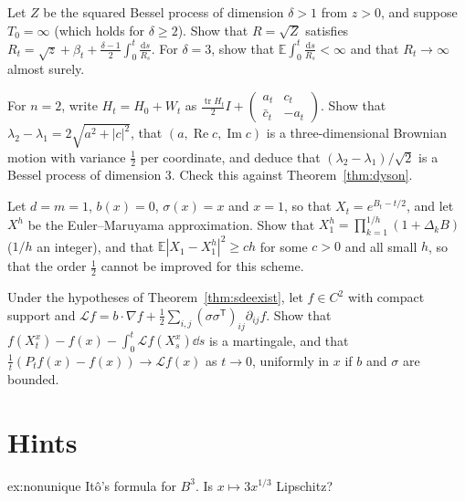 \begin{exercise}[$\star\star$]\label{ex:bessel3}
Let $Z$ be the squared Bessel process of dimension $\delta>1$ from $z>0$, and suppose $T_0=\infty$ (which holds for $\delta\ge2$). Show that $R=\sqrt Z$ satisfies $R_t=\sqrt z+\beta_t+\frac{\delta-1}2\int_0^t\frac{\mathrm ds}{R_s}$.
For $\delta=3$, show that $\mathbb E\int_0^t\frac{\mathrm ds}{R_s}<\infty$ and that $R_t\to\infty$ almost surely.
\end{exercise}

\begin{exercise}[$\star\star$]\label{ex:twobytwo}
For $n=2$, write $H_t=H_0+W_t$ as $\frac{\operatorname{tr}H_t}2I+\begin{pmatrix}a_t&c_t\\\bar c_t&-a_t\end{pmatrix}$. Show that $\lambda_2-\lambda_1=2\sqrt{a^2+|c|^2}$, that $(a,\operatorname{Re}c,\operatorname{Im}c)$ is a
three-dimensional Brownian motion with variance $\frac12$ per coordinate, and deduce that $(\lambda_2-\lambda_1)/\sqrt2$ is a Bessel process of dimension $3$. Check this against Theorem~\ref{thm:dyson}.
\end{exercise}

\begin{exercise}[$\star\star$]\label{ex:emgbm}
Let $d=m=1$, $b(x)=0$, $\sigma(x)=x$ and $x=1$, so that $X_t=e^{B_t-t/2}$, and let $X^h$ be the Euler--Maruyama approximation. Show that $X^h_1=\prod_{k=1}^{1/h}(1+\Delta_kB)$ ($1/h$ an integer), and that
$\mathbb E|X_1-X^h_1|^2\ge ch$ for some $c>0$ and all small $h$, so that the order $\frac12$ cannot be improved for this scheme.
\end{exercise}

\begin{exercise}[$\star\star\star$]\label{ex:sdegenerator}
Under the hypotheses of Theorem~\ref{thm:sdeexist}, let $f\in C^2$ with compact support and $\mathcal Lf=b\cdot\nabla f+\frac12\sum_{i,j}(\sigma\sigma^{\mathsf T})_{ij}\partial_{ij}f$. Show that
$f(X^x_t)-f(x)-\int_0^t\mathcal Lf(X^x_s)\dd s$ is a martingale, and that $\frac1t(P_tf(x)-f(x))\to\mathcal Lf(x)$ as $t\to0$, uniformly in $x$ if $b$ and $\sigma$ are bounded.
\end{exercise}

\section{Hints}

\begin{hint}{ex:nonunique}
It\^o's formula for $B^3$. Is $x\mapsto3x^{1/3}$ Lipschitz?
\end{hint}

